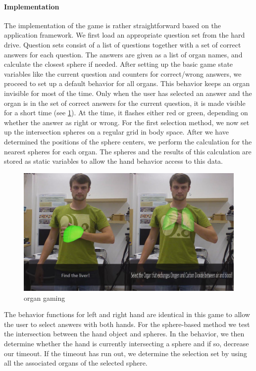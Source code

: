 \paragraph{Implementation}
The implementation of the game is rather straightforward based on the application framework. We first load an appropriate question set from the hard drive. Question sets consist of a list of questions together with a set of correct answers for each question. The answers are given as a list of organ names, and calculate the closest sphere if needed.
After setting up the basic game state variables like the current question and counters for correct/wrong answers, we proceed to set up a default behavior for all organs. This behavior keeps an organ invisible for most of the time. Only when the user has selected an answer and the organ is in the set of correct answers for the current question, it is made visible for a short time (see \figurename{\ref{fig:3-IMR:organGaming}}). At the time, it flashes either red or green, depending on whether the answer as right or wrong.
For the first selection method, we now set up the intersection spheres on a regular grid in body space. After we have determined the positions of the sphere centers, we perform the calculation for the nearest spheres for each organ. The spheres and the results of this calculation are stored as static variables to allow the hand behavior access to this data.
\begin{figure}
\centering
\includegraphics[width=0.7\linewidth]{figures/3-IMR/organGaming}
\caption{organ gaming}
\label{fig:3-IMR:organGaming}
\end{figure}
The behavior functions for left and right hand are identical in this game to allow the user to select answers with both hands.
For the sphere-based method we test the intersection between the hand object and spheres. In the behavior, we then determine whether the hand is currently intersecting a sphere and if so, decrease our timeout. If the timeout has run out, we determine the selection set by using all the associated organs of the selected sphere.
